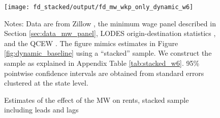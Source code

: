 
\begin{figure}[h!]
    \centering
    \caption{Estimates of the effect of the MW on rents, stacked sample including
             leads and lags}
    \label{fig:dynamic_stacked}

    \texttt{[image: fd\_stacked/output/fd\_mw\_wkp\_only\_dynamic\_w6]}

    \begin{minipage}{.95\textwidth} \footnotesize
        \vspace{3mm}
        Notes:
        Data are from Zillow \parencite{ZillowData},
        the minimum wage panel described in Section \ref{sec:data_mw_panel}, 
        LODES origin-destination statistics \parencite{CensusLODES},
        and the QCEW \parencite{QCEW}.
        The figure mimics estimates in Figure \ref{fig:dynamic_baseline} 
        using a ``stacked'' sample.
        We construct the sample as explained in Appendix Table \ref{tab:stacked_w6}.
        95\% pointwise confidence intervals are obtained from standard errors 
        clustered at the state level.
    \end{minipage}
\end{figure}
